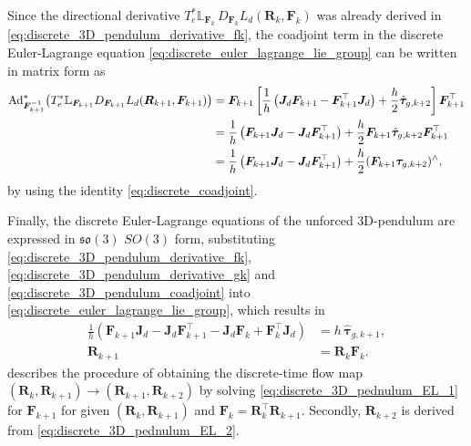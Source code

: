 Since the directional derivative
$T_e^*\mathbb{L}_{\bm{F}_k}\,D_{\bm{F}_k}L_d(\bm{R}_k,\bm{F}_k)$
was already derived in \eqref{eq:discrete_3D_pendulum_derivative_fk}, the coadjoint term in the discrete Euler-Lagrange equation \eqref{eq:discrete_euler_lagrange_lie_group} can be written in matrix form as 
{\small
\begin{align}
\operatorname{Ad}^{*}_{\bm{F}_{k+1}^{-1}}
\!\left(
T_e^*\mathbb{L}_{\bm{F}_{k+1}}
D_{\bm{F}_{k+1}}L_d(\bm{R}_{k+1},\bm{F}_{k+1})
\right)
&=
\bm{F}_{k+1}
\left[
\frac{1}{h}
\left(
\bm{J}_d\bm{F}_{k+1}
-
\bm{F}_{k+1}^{\top}\bm{J}_d
\right)
+
\frac{h}{2}\hat{\bm{\tau}}_{g,k+2}
\right]
\bm{F}_{k+1}^{\top}
\notag\\
&=
\frac{1}{h}
\left(
\bm{F}_{k+1}\bm{J}_d
-
\bm{J}_d\bm{F}_{k+1}^{\top}
\right)
+
\frac{h}{2}\bm{F}_{k+1}\hat{\bm{\tau}}_{g,k+2}\bm{F}_{k+1}^{\top}
\notag\\
&=
\frac{1}{h}
\left(
\bm{F}_{k+1}\bm{J}_d
-
\bm{J}_d\bm{F}_{k+1}^{\top}
\right)
+
\frac{h}{2}(\bm{F}_{k+1}\bm{\tau}_{g,k+2})^\wedge\label{eq:discrete_3D_pendulum_coadjoint},
\end{align}}
by using the identity \eqref{eq:discrete_coadjoint}.

Finally, the discrete Euler-Lagrange equations of the unforced 3D-pendulum are expressed in $\mathfrak{so}(3)$ $SO(3)$ form, substituting \eqref{eq:discrete_3D_pendulum_derivative_fk}, \eqref{eq:discrete_3D_pendulum_derivative_gk} and \eqref{eq:discrete_3D_pendulum_coadjoint} into \eqref{eq:discrete_euler_lagrange_lie_group}, which results in
\begin{subequations}\label{eq:discrete_3D_pendulum_EL}
\begin{align}
    \label{eq:discrete_3D_pednulum_EL_1}
    \frac{1}{h}\left(
        \bm{F}_{k+1}\bm{J}_d
        - \bm{J}_d\bm{F}_{k+1}^{\top}
        - \bm{J}_d\bm{F}_k
        + \bm{F}_k^{\top}\bm{J}_d
    \right)
    &=
    h\,\hat{\bm{\tau}}_{g,k+1}, \\
    \label{eq:discrete_3D_pednulum_EL_2}
    \bm{R}_{k+1} &= \bm{R}_k \bm{F}_k.
\end{align}
\end{subequations}
\cite{Lee2008} describes the procedure of obtaining the discrete-time flow map $(\bm{R}_{k},\bm{R}_{k+1}) \to (\bm{R}_{k+1},\bm{R}_{k+2})$ by solving \eqref{eq:discrete_3D_pednulum_EL_1} for $\bm{F}_{k+1}$ for given $(\bm{R}_{k},\bm{R}_{k+1})$ and $\bm{F}_k = \bm{R}_k^\top\bm{R}_{k+1}$. Secondly, $\bm{R}_{k+2}$ is derived from \eqref{eq:discrete_3D_pednulum_EL_2}.  

